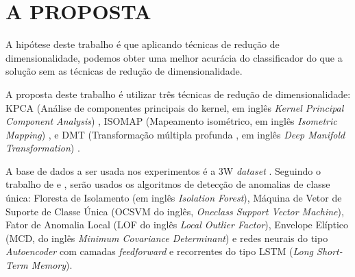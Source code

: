 \section{A PROPOSTA}
A hipótese deste trabalho é que aplicando técnicas de redução de dimensionalidade, podemos obter uma melhor acurácia do classificador do que a solução sem as técnicas de redução de dimensionalidade.

A proposta deste trabalho é utilizar três  técnicas de redução de dimensionalidade: KPCA (Análise de componentes principais do kernel, em inglês \textit {Kernel Principal Component Analysis}) \cite{nanga2021review}, ISOMAP (Mapeamento isométrico, em inglês \textit{Isometric Mapping}) \cite{jia2022iso}, e DMT (Transformação múltipla profunda , em inglês \textit{Deep Manifold Transformation}) \cite{li2020DTM}.

A base de dados a ser usada nos experimentos é a 3W \textit{dataset} \cite{vargas2019base}. Seguindo o trabalho de  e , serão usados os algoritmos de detecção de anomalias de classe única: Floresta de Isolamento (em inglês \textit{Isolation Forest}), Máquina de Vetor de Suporte de Classe Única (OCSVM do inglês, \textit{Oneclass Support Vector Machine}), Fator de Anomalia Local (LOF do inglês \textit{Local Outlier Factor}), Envelope Elíptico (MCD, do inglês \textit{Minimum Covariance Determinant}) e redes neurais do tipo \textit{Autoencoder} com camadas \textit{feedforward} e recorrentes do tipo LSTM (\textit{Long Short-Term Memory}). 

